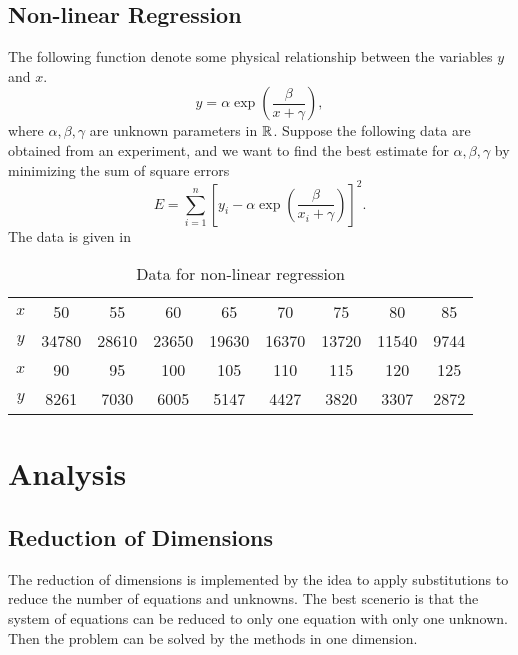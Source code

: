 \subsection{Non-linear Regression}
The following function denote some physical relationship between the variables \(y\) and \(x\).
\[ y=\alpha\exp\left(\frac{\beta}{x+\gamma}\right), \]
where \(\alpha,\beta,\gamma\) are unknown parameters in \(\mathbb{R}\).
Suppose the following data are obtained from an experiment, and we want to find the best estimate for \(\alpha,\beta,\gamma\) by minimizing the sum of square errors
\begin{equation}\label{sse}
E=\sum_{i=1}^{n} \left[  y_i-\alpha\exp\left(\frac{\beta}{x_i+\gamma}\right) \right]^2.
\end{equation}
The data is given in
\ifnum{}
	\begin{table}[H]
\else
	\begin{table}[htbp]
\fi
	\centering
	\begin{tabular}{ccccccccc}
	\hline
	\(x\)	&	50	&	55	&	60	&	65	&	70	&	75	&	80	&	85	\\
	\(y\)	&	34780	&	28610	&	23650	&	19630	&	16370	&	13720	&	11540	&	9744			\\	\hline\hline
	\(x\)	&	90	&	95	&	100	&	105	&	110	&	115	&	120	&	125 \\
	\(y\)	&	8261	&	7030	&	6005	&	5147	&	4427	&	3820	&	3307	&	2872	\\	\hline
	\end{tabular}
	\caption{Data for non-linear regression}
	\label{regression}
	\end{table}





\section{Analysis}
\subsection{Reduction of Dimensions}
The reduction of dimensions is implemented by the idea to apply substitutions to reduce the number of equations and unknowns.
The best scenerio is that the system of equations can be reduced to only one equation with only one unknown. 
Then the problem can be solved by the methods in one dimension.


\end{table}
